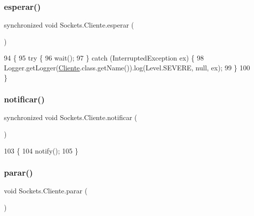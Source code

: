 \subsubsection{\texorpdfstring{esperar()}{esperar()}}
{\footnotesize\ttfamily synchronized void Sockets.\+Cliente.\+esperar (\begin{DoxyParamCaption}{ }\end{DoxyParamCaption})\hspace{0.3cm}{\ttfamily [inline]}}


\begin{DoxyCode}
94     \{
95         \textcolor{keywordflow}{try} \{
96             wait();
97         \} \textcolor{keywordflow}{catch} (InterruptedException ex) \{
98             Logger.getLogger(\mbox{\hyperlink{class_sockets_1_1_cliente_ab3aed9d5de2bafbb190c27a9c5e7cfd1}{Cliente}}.class.getName()).log(Level.SEVERE, null, ex);
99         \}
100     \}
\end{DoxyCode}
\mbox{\label{class_sockets_1_1_cliente_a8c72e0702477bfa5ab697ed20fb0a490}} 
\subsubsection{\texorpdfstring{notificar()}{notificar()}}
{\footnotesize\ttfamily synchronized void Sockets.\+Cliente.\+notificar (\begin{DoxyParamCaption}{ }\end{DoxyParamCaption})\hspace{0.3cm}{\ttfamily [inline]}}


\begin{DoxyCode}
103     \{
104         notify();
105     \}
\end{DoxyCode}
\mbox{\label{class_sockets_1_1_cliente_aef765880b11e7868501bfff2fa4000f6}} 
\subsubsection{\texorpdfstring{parar()}{parar()}}
{\footnotesize\ttfamily void Sockets.\+Cliente.\+parar (\begin{DoxyParamCaption}{ }\end{DoxyParamCaption})\hspace{0.3cm}{\ttfamily [inline]}}


